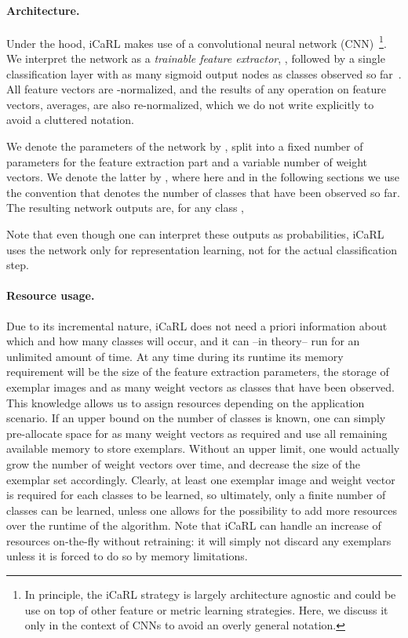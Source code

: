 \documentclass[10pt,twocolumn,letterpaper]{article}
\begin{document}
\paragraph{Architecture.} Under the hood, iCaRL makes use of 
a convolutional neural network (CNN)~\cite{LeCun1998}\footnote{In principle, 
the iCaRL strategy is largely architecture agnostic and could 
be use on top of other feature or metric learning strategies. 
Here, we discuss it only in the context of CNNs 
to avoid an overly general notation.}. 
We interpret the network as a \emph{trainable feature extractor}, 
, followed by a single classification layer with 
as many sigmoid output nodes as classes observed so far~\cite{bengio2013representation}. 
All feature vectors are -normalized, and the results of any 
operation on feature vectors, \eg averages, are also re-normalized,
which we do not write explicitly to avoid a cluttered notation.

We denote the parameters of the network by , split into  
a fixed number of parameters for the feature extraction part 
and a variable number of weight vectors. We denote the latter 
by , 
where here and in the following sections we use the convention 
that  denotes the number of classes that have been observed so far.
The resulting network outputs are, for any class ,

Note that even though one can interpret these outputs as probabilities, 
iCaRL uses the network only for representation learning, not for the actual 
classification step.

\paragraph{Resource usage.} Due to its incremental nature, iCaRL does not need a priori 
information about which and how many classes will occur, and 
it can --in theory-- run for an unlimited amount of time. 
At any time during its runtime its memory requirement will 
be the size of the feature extraction parameters, the 
storage of  exemplar images and as many weight vectors 
as classes that have been observed.
This knowledge allows us to assign resources depending 
on the application scenario. 
If an upper bound on the number of classes is known, one 
can simply pre-allocate space for as many weight vectors 
as required and use all remaining available memory to 
store exemplars. 
Without an upper limit, one would actually grow the number of 
weight vectors over time, and decrease the size of the exemplar 
set accordingly. 
Clearly, at least one exemplar image and weight vector is 
required for each classes to be learned, so ultimately, 
only a finite number of classes can be learned, unless 
one allows for the possibility to add more resources over 
the runtime of the algorithm. 
Note that iCaRL can handle an increase of resources on-the-fly 
without retraining: it will simply not discard any exemplars 
unless it is forced to do so by memory limitations. 
\end{document}
